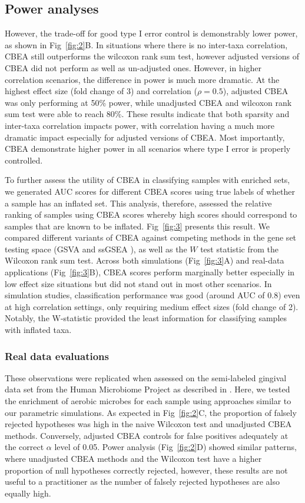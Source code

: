 \subsection{Power analyses}
However, the trade-off for good type I error control is demonstrably lower power, as shown in Fig~\ref{fig:2}B. In situations where there is no inter-taxa correlation, CBEA still outperforms the wilcoxon rank sum test, however adjusted versions of CBEA did not perform as well as un-adjusted ones. However, in higher correlation scenarios, the difference in power is much more dramatic. At the highest effect size (fold change of 3) and correlation ($\rho = 0.5$), adjusted CBEA was only performing at 50\% power, while unadjusted CBEA and wilcoxon rank sum test were able to reach 80\%. These results indicate that both sparsity and inter-taxa correlation impacts power, with correlation having a much more dramatic impact especially for adjusted versions of CBEA. Most importantly, CBEA demonstrate higher power in all scenarios where type I error is properly controlled.    

To further assess the utility of CBEA in classifying samples with enriched sets, we generated AUC scores for different CBEA scores using true labels of whether a sample has an inflated set. This analysis, therefore, assessed the relative ranking of samples using CBEA scores whereby high scores should correspond to samples that are known to be inflated. Fig~\ref{fig:3} presents this result. We compared different variants of CBEA against competing methods in the gene set testing space (GSVA \cite{hanzelmann2013} and ssGSEA \cite{barbie2009}), as well as the $W$ test statistic from the Wilcoxon rank sum test. Across both simulations (Fig~\ref{fig:3}A) and real-data applications (Fig~\ref{fig:3}B), CBEA scores perform marginally better especially in low effect size situations but did not stand out in most other scenarios. In simulation studies, classification performance was good (around AUC of 0.8) even at high correlation settings, only requiring medium effect sizes (fold change of 2). Notably, the W-statistic provided the least information for classifying samples with inflated taxa.

\subsubsection*{Real data evaluations}  
These observations were replicated when assessed on the semi-labeled gingival data set from the Human Microbiome Project as described in . Here, we tested the enrichment of aerobic microbes for each sample using approaches similar to our parametric simulations. As expected in Fig~\ref{fig:2}C, the proportion of falsely rejected hypotheses was high in the naive Wilcoxon test and unadjusted CBEA methods. Conversely, adjusted CBEA controls for false positives adequately at the correct $\alpha$ level of 0.05. Power analysis (Fig~\ref{fig:2}D) showed similar patterns, where unadjusted CBEA methods and the Wilcoxon test have a higher proportion of null hypotheses correctly rejected, however, these results are not useful to a practitioner as the number of falsely rejected hypotheses are also equally high.

